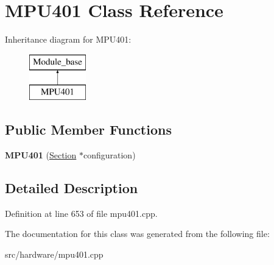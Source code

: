 \hypertarget{classMPU401}{\section{M\-P\-U401 Class Reference}
\label{classMPU401}
}
Inheritance diagram for M\-P\-U401\-:\begin{figure}[H]
\begin{center}
\leavevmode
\includegraphics[height=2.000000cm]{classMPU401}
\end{center}
\end{figure}
\subsection*{Public Member Functions}
\begin{DoxyCompactItemize}
\item 
\hypertarget{classMPU401_a7df40b93d9eb674d176f26e368af32f2}{{\bfseries M\-P\-U401} (\hyperlink{classSection}{Section} $\ast$configuration)}\label{classMPU401_a7df40b93d9eb674d176f26e368af32f2}

\end{DoxyCompactItemize}


\subsection{Detailed Description}


Definition at line 653 of file mpu401.\-cpp.



The documentation for this class was generated from the following file\-:\begin{DoxyCompactItemize}
\item 
src/hardware/mpu401.\-cpp\end{DoxyCompactItemize}
